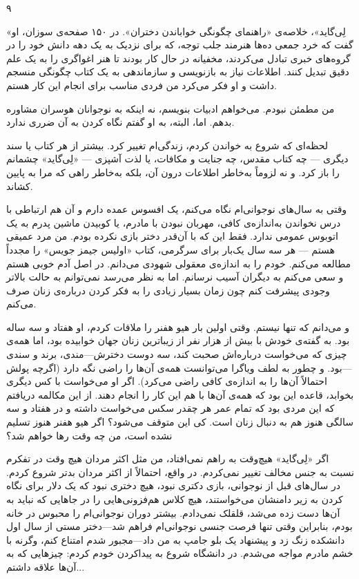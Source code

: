 ۹

«لِی‌گاید»، خلاصه‌ی «راهنمای چگونگی خواباندن دختران». در ۱۵۰ صفحه‌ی سوزان، او گفت که خرد جمعی ده‌ها هنرمند جلب توجه، که برای نزدیک به یک دهه دانش خود را در گروه‌های خبری تبادل می‌کردند، مخفیانه در حال کار بودند تا هنر اغواگری را به یک علم دقیق تبدیل کنند. اطلاعات نیاز به بازنویسی و سازماندهی به یک کتاب چگونگی منسجم داشت و او فکر می‌کرد من فردی مناسب برای انجام این کار هستم.

من مطمئن نبودم. می‌خواهم ادبیات بنویسم، نه اینکه به نوجوانان هوسران مشاوره‌ بدهم. اما، البته، به او گفتم نگاه کردن به آن ضرری ندارد.

لحظه‌ای که شروع به خواندن کردم، زندگی‌ام تغییر کرد. بیشتر از هر کتاب یا سند دیگری — چه کتاب مقدس، چه جنایت و مکافات، یا لذت آشپزی — «لِی‌گاید» چشمانم را باز کرد. و نه لزوماً به‌خاطر اطلاعات درون آن، بلکه به‌خاطر راهی که مرا به پایین کشاند.

وقتی به سال‌های نوجوانی‌ام نگاه می‌کنم، یک افسوس عمده دارم و آن هم ارتباطی با درس نخواندن به‌اندازه‌ی کافی، مهربان نبودن با مادرم، یا کوبیدن ماشین پدرم به یک اتوبوس عمومی ندارد. فقط این که با آن‌قدر دختر بازی نکرده بودم. من مرد عمیقی هستم — هر سه سال یک‌بار برای سرگرمی، کتاب «اولیس جیمز جویس» را مجدداً مطالعه می‌کنم. خودم را به اندازه‌ی معقولی شهودی می‌دانم. در اصل آدم خوبی هستم و سعی می‌کنم به دیگران آسیب نرسانم. اما به نظر می‌رسد نمی‌توانم به حالت بالاتر وجودی پیشرفت کنم چون زمان بسیار زیادی را به فکر کردن درباره‌ی زنان صرف می‌کنم.

و می‌دانم که تنها نیستم. وقتی اولین بار هیو هفنر را ملاقات کردم، او هفتاد و سه ساله بود. به گفته‌ی خودش با بیش از هزار نفر از زیباترین زنان جهان خوابیده بود، اما همه‌ی چیزی که می‌خواست درباره‌اش صحبت کند، سه دوست دخترش—مندی، برند و سندی—بود. و چطور به لطف ویاگرا می‌توانست همه‌ی آن‌ها را راضی نگه دارد (اگرچه پولش احتمالاً آن‌ها را به اندازه‌ی کافی راضی می‌کرد). اگر او می‌خواست با کس دیگری بخوابد، قاعده این بود که همه‌ی آن‌ها با هم این کار را انجام دهند. از این مکالمه دریافتم که این مردی بود که تمام عمر هر چقدر سکس می‌خواست داشته و در هفتاد و سه سالگی هنوز هم به دنبال زنان است. کی این متوقف می‌شود؟ اگر هیو هفنر هنوز تسلیم نشده است، من چه وقت رها خواهم شد؟

اگر «لِی‌گاید» هیچ‌وقت به راهم نمی‌افتاد، من مثل اکثر مردان هیچ وقت در تفکرم نسبت به جنس مخالف تغییر نمی‌کردم. در واقع، احتمالاً از اکثر مردان بدتر شروع کردم. در سال‌های قبل از نوجوانی، بازی دکتری نبود، هیچ دختری نبود که یک دلار برای نگاه کردن به زیر دامنشان می‌خواستند، هیچ کلاس هم‌فزونی‌هایی را در جاهایی که نباید به آن‌ها دست زده می‌شد، قلقلک نمی‌دادم. بیشتر دوران نوجوانی‌ام را محبوس در خانه بودم، بنابراین وقتی تنها فرصت جنسی نوجوانی‌ام فراهم شد—دختر مستی از سال اول دانشکده زنگ زد و پیشنهاد یک بلو جامپ به من داد—مجبور شدم امتناع کنم، وگرنه با خشم مادرم مواجه می‌شدم. در دانشگاه شروع به پیداکردن خودم کردم: چیزهایی که به آن‌ها علاقه داشتم...